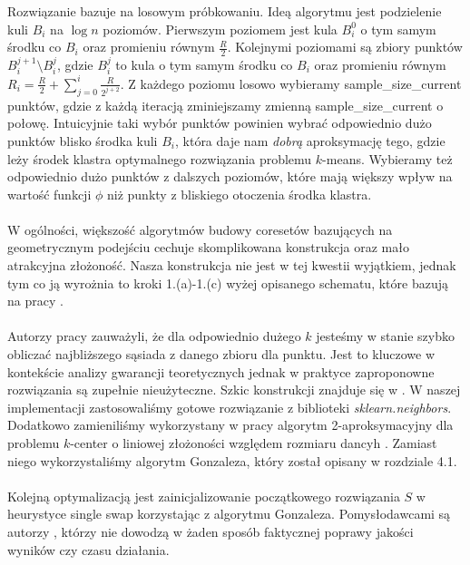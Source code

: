 Rozwiązanie bazuje na losowym próbkowaniu.
Ideą algorytmu jest podzielenie kuli $B_{i}$ na $\log n$ poziomów.
Pierwszym poziomem jest kula $B_{i}^{0}$ o tym samym środku co $B_{i}$ oraz promieniu równym $\frac{R}{2}$. 
Kolejnymi poziomami są zbiory punktów $B_{i}^{j+1} \setminus B_{i}^{j}$, gdzie $B_{i}^{j}$ to kula o tym samym środku co $B_{i}$ oraz promieniu równym $R_{i} = \frac{R}{2} + \sum_{j=0}^{i} \frac{R}{2^{j+2}}$.
Z każdego poziomu losowo wybieramy sample\_size\_current punktów, gdzie z każdą iteracją zminiejszamy zmienną sample\_size\_current o połowę.
Intuicyjnie taki wybór punktów powinien wybrać odpowiednio dużo punktów blisko środka kuli $B_{i}$, która daje nam \textit{dobrą} aproksymację tego, gdzie leży środek klastra optymalnego rozwiązania problemu $k$-means.
Wybieramy też odpowiednio dużo punktów z dalszych poziomów, które mają większy wpływ na wartość funkcji $\phi$ niż punkty z bliskiego otoczenia środka klastra. 
\\~\\
W ogólności, większość algorytmów budowy coresetów bazujących na geometrycznym podejściu cechuje skomplikowana konstrukcja oraz mało atrakcyjna złożoność.
Nasza konstrukcja nie jest w tej kwestii wyjątkiem, jednak tym co ją wyrożnia to kroki 1.(a)-1.(c) wyżej opisanego schematu, które bazują na pracy \cite{10.1145/1007352.1007400}.
\\~\\
Autorzy pracy \cite{10.1145/1007352.1007400} zauważyli, że dla odpowiednio dużego $k$ jesteśmy w stanie szybko obliczać najbliższego sąsiada z danego zbioru dla punktu.
Jest to kluczowe w kontekście analizy gwarancji teoretycznych jednak w praktyce zaproponowne rozwiązania są zupełnie nieużyteczne.
Szkic konstrukcji znajduje się w \cite{10.1145/1007352.1007400}.
W naszej implementacji zastosowaliśmy gotowe rozwiązanie z biblioteki \textit{sklearn.neighbors}.
Dodatkowo zamieniliśmy wykorzystany w pracy \cite{10.1145/1007352.1007400} algorytm 2-aproksymacyjny dla problemu $k$-center o liniowej złożoności względem rozmiaru dancyh \cite{10.5555/3116656.3116964}.
Zamiast niego wykorzystaliśmy algorytm Gonzaleza, który został opisany w rozdziale 4.1.
\\~\\
Kolejną optymalizacją jest zainicjalizowanie początkowego rozwiązania $S$ w heurystyce single swap korzystając z algorytmu Gonzaleza.
Pomysłodawcami są autorzy \cite{10.1145/1007352.1007400}, którzy nie dowodzą w żaden sposób faktycznej poprawy jakości wyników czy czasu działania.
\\~\\
